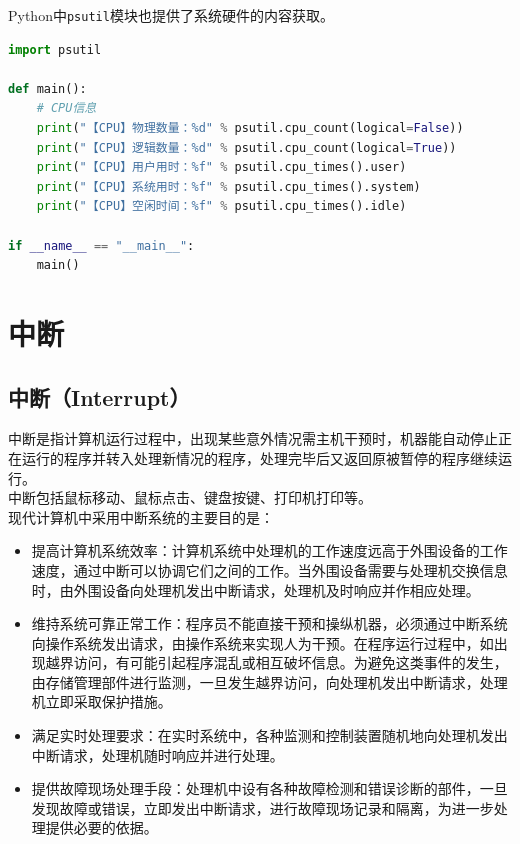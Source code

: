 Python中\lstinline|psutil|模块也提供了系统硬件的内容获取。 \\

\begin{lstlisting}[language=Python]
import psutil

def main():
	# CPU信息
	print("【CPU】物理数量：%d" % psutil.cpu_count(logical=False))
	print("【CPU】逻辑数量：%d" % psutil.cpu_count(logical=True))
	print("【CPU】用户用时：%f" % psutil.cpu_times().user)
	print("【CPU】系统用时：%f" % psutil.cpu_times().system)
	print("【CPU】空闲时间：%f" % psutil.cpu_times().idle)

if __name__ == "__main__":
	main()
\end{lstlisting}

\newpage

\section{中断}

\subsection{中断（Interrupt）}

中断是指计算机运行过程中，出现某些意外情况需主机干预时，机器能自动停止正在运行的程序并转入处理新情况的程序，处理完毕后又返回原被暂停的程序继续运行。 \\

中断包括鼠标移动、鼠标点击、键盘按键、打印机打印等。 \\

现代计算机中采用中断系统的主要目的是：

\begin{itemize}
	\item 提高计算机系统效率：计算机系统中处理机的工作速度远高于外围设备的工作速度，通过中断可以协调它们之间的工作。当外围设备需要与处理机交换信息时，由外围设备向处理机发出中断请求，处理机及时响应并作相应处理。

	\item 维持系统可靠正常工作：程序员不能直接干预和操纵机器，必须通过中断系统向操作系统发出请求，由操作系统来实现人为干预。在程序运行过程中，如出现越界访问，有可能引起程序混乱或相互破坏信息。为避免这类事件的发生，由存储管理部件进行监测，一旦发生越界访问，向处理机发出中断请求，处理机立即采取保护措施。

	\item 满足实时处理要求：在实时系统中，各种监测和控制装置随机地向处理机发出中断请求，处理机随时响应并进行处理。

	\item 提供故障现场处理手段：处理机中设有各种故障检测和错误诊断的部件，一旦发现故障或错误，立即发出中断请求，进行故障现场记录和隔离，为进一步处理提供必要的依据。
\end{itemize}

